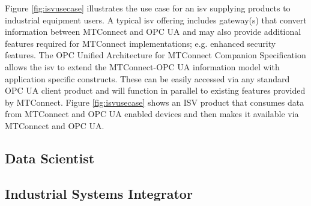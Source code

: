 Figure \ref{fig:isvusecase} illustrates the use case for an \gls{isv} supplying products to industrial equipment users. A typical \gls{isv} offering includes gateway(s) that convert information between MTConnect and OPC UA and may also provide additional features required for MTConnect implementations; e.g. enhanced security features. The OPC Unified Architecture for MTConnect Companion Specification allows the \gls{isv} to extend the MTConnect-OPC UA information model with application specific constructs. These can be easily accessed via any standard OPC UA client product and will function in parallel to existing features provided by MTConnect. Figure \ref{fig:isvusecase} shows an ISV product that consumes data from MTConnect and OPC UA enabled devices and then makes it available via MTConnect and OPC UA.


\FloatBarrier

\subsection{Data Scientist}

\FloatBarrier

\subsection{Industrial Systems Integrator}

\FloatBarrier

